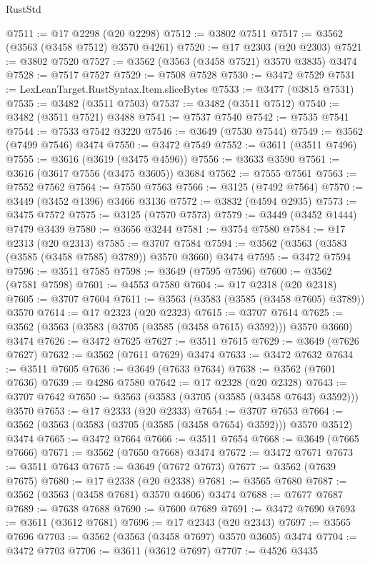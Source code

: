 \begin{lexlean}{RustStd}
\begin{coremodule}
{\begin{coremodule}
{{{{{{{{{{{{{{{{{{{{{{{{{{{{{{{{{{{{{{{{{{{{{@7511 := @17 @2298 (@20 @2298)
@7512 := @3802 @7511
@7517 := @3562 (@3563 (@3458 @7512) @3570 @4261)
@7520 := @17 @2303 (@20 @2303)
@7521 := @3802 @7520
@7527 := @3562 (@3563 (@3458 @7521) @3570 @3835) @3474
@7528 := @7517 @7527
@7529 := @7508 @7528
@7530 := @3472 @7529
@7531 := LexLeanTarget.RustSyntax.Item.sliceBytes
@7533 := @3477 (@3815 @7531)
@7535 := @3482 (@3511 @7503)
@7537 := @3482 (@3511 @7512)
@7540 := @3482 (@3511 @7521) @3488
@7541 := @7537 @7540
@7542 := @7535 @7541
@7544 := @7533 @7542 @3220
@7546 := @3649 (@7530 @7544)
@7549 := @3562 (@7499 @7546) @3474
@7550 := @3472 @7549
@7552 := @3611 (@3511 @7496)
@7555 := @3616 (@3619 (@3475 @4596))
@7556 := @3633 @3590
@7561 := @3616 (@3617 @7556 (@3475 @3605)) @3684
@7562 := @7555 @7561
@7563 := @7552 @7562
@7564 := @7550 @7563
@7566 := @3125 (@7492 @7564)
@7570 := @3449 (@3452 @1396) @3466 @3136
@7572 := @3832 (@4594 @2935)
@7573 := @3475 @7572
@7575 := @3125 (@7570 @7573)
@7579 := @3449 (@3452 @1444) @7479 @3439
@7580 := @3656 @3244
@7581 := @3754 @7580
@7584 := @17 @2313 (@20 @2313)
@7585 := @3707 @7584
@7594 := @3562 (@3563 (@3583 (@3585 (@3458 @7585) @3789)) @3570 @3660) @3474
@7595 := @3472 @7594
@7596 := @3511 @7585
@7598 := @3649 (@7595 @7596)
@7600 := @3562 (@7581 @7598)
@7601 := @4553 @7580
@7604 := @17 @2318 (@20 @2318)
@7605 := @3707 @7604
@7611 := @3563 (@3583 (@3585 (@3458 @7605) @3789)) @3570
@7614 := @17 @2323 (@20 @2323)
@7615 := @3707 @7614
@7625 := @3562 (@3563 (@3583 (@3705 (@3585 (@3458 @7615) @3592))) @3570 @3660) @3474
@7626 := @3472 @7625
@7627 := @3511 @7615
@7629 := @3649 (@7626 @7627)
@7632 := @3562 (@7611 @7629) @3474
@7633 := @3472 @7632
@7634 := @3511 @7605
@7636 := @3649 (@7633 @7634)
@7638 := @3562 (@7601 @7636)
@7639 := @4286 @7580
@7642 := @17 @2328 (@20 @2328)
@7643 := @3707 @7642
@7650 := @3563 (@3583 (@3705 (@3585 (@3458 @7643) @3592))) @3570
@7653 := @17 @2333 (@20 @2333)
@7654 := @3707 @7653
@7664 := @3562 (@3563 (@3583 (@3705 (@3585 (@3458 @7654) @3592))) @3570 @3512) @3474
@7665 := @3472 @7664
@7666 := @3511 @7654
@7668 := @3649 (@7665 @7666)
@7671 := @3562 (@7650 @7668) @3474
@7672 := @3472 @7671
@7673 := @3511 @7643
@7675 := @3649 (@7672 @7673)
@7677 := @3562 (@7639 @7675)
@7680 := @17 @2338 (@20 @2338)
@7681 := @3565 @7680
@7687 := @3562 (@3563 (@3458 @7681) @3570 @4606) @3474
@7688 := @7677 @7687
@7689 := @7638 @7688
@7690 := @7600 @7689
@7691 := @3472 @7690
@7693 := @3611 (@3612 @7681)
@7696 := @17 @2343 (@20 @2343)
@7697 := @3565 @7696
@7703 := @3562 (@3563 (@3458 @7697) @3570 @3605) @3474
@7704 := @3472 @7703
@7706 := @3611 (@3612 @7697)
@7707 := @4526 @3435
}}}}}}}}}}}}}}}}}}}}}}}}}}}}}}}}}}}}}}}}}}}}}
\end{coremodule}}
\end{coremodule}
\end{lexlean}

